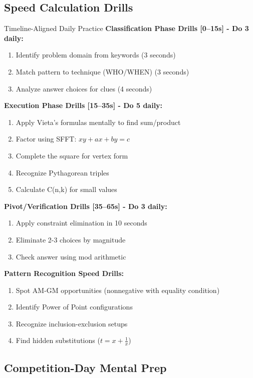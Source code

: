 \documentclass{article}
\begin{document}
\subsection{Speed Calculation Drills}

\begin{mentalbox}{Timeline-Aligned Daily Practice}
\textbf{Classification Phase Drills [0--15s] - Do 3 daily:}
\begin{enumerate}[nosep]
\item Identify problem domain from keywords (3 seconds)
\item Match pattern to technique (WHO/WHEN) (3 seconds)
\item Analyze answer choices for clues (4 seconds)
\end{enumerate}

\textbf{Execution Phase Drills [15--35s] - Do 5 daily:}
\begin{enumerate}[nosep]
\item Apply Vieta's formulas mentally to find sum/product
\item Factor using SFFT: $xy + ax + by = c$
\item Complete the square for vertex form
\item Recognize Pythagorean triples
\item Calculate C(n,k) for small values
\end{enumerate}

\textbf{Pivot/Verification Drills [35--65s] - Do 3 daily:}
\begin{enumerate}[nosep]
\item Apply constraint elimination in 10 seconds
\item Eliminate 2-3 choices by magnitude
\item Check answer using mod arithmetic
\end{enumerate}

\textbf{Pattern Recognition Speed Drills:}
\begin{enumerate}[nosep]
\item Spot AM-GM opportunities (nonnegative with equality condition)
\item Identify Power of Point configurations
\item Recognize inclusion-exclusion setups
\item Find hidden substitutions ($t = x + \frac{1}{x}$)
\end{enumerate}
\end{mentalbox}

\subsection{Competition-Day Mental Prep}
\end{document}
